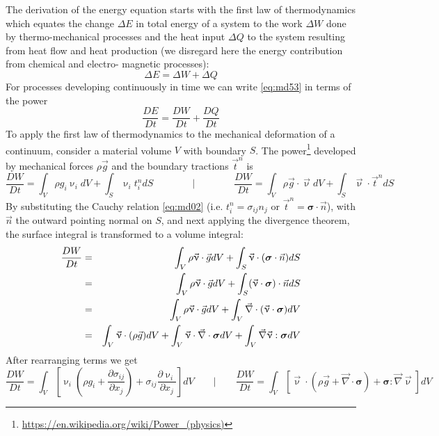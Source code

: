 The derivation of the energy equation starts with the first law of thermodynamics which
equates the change $\Delta E$ in total energy of a system to the work $\Delta W$ done by 
thermo-mechanical processes and the heat input $\Delta Q$ to the system resulting from heat flow and
heat production (we disregard here the energy contribution from chemical and electro-
magnetic processes):
\begin{equation}
\Delta E = \Delta W + \Delta Q
\label{eq:md53}
\end{equation}
For processes developing continuously in time we can write \eqref{eq:md53} in terms of the power
\begin{equation}
\frac{D E}{Dt} = \frac{D W}{Dt} + \frac{D Q}{Dt}
\label{eq:md54}
\end{equation}
To apply the first law of thermodynamics to the mechanical deformation of a continuum,
consider a material volume $V$ with boundary $S$. The power\footnote{
\url{https://en.wikipedia.org/wiki/Power_(physics)}} developed by mechanical
forces $\rho \vec{g}$ and the boundary tractions $\vec{t}^n$ is
\begin{equation}
\frac{DW}{Dt} = \int_V \rho g_i \upnu_i dV + \int_S \upnu_i t_i^n  dS
\qquad
\qquad
\bigg\rvert
\qquad
\qquad
\frac{DW}{Dt} = \int_V \rho \vec{g}\cdot \vec\upnu dV 
+ \int_S \vec\upnu\cdot \vec{t}^n  dS
\label{eq:md55}
\end{equation}
By substituting the Cauchy relation \eqref{eq:md02}
(i.e. $t_i^n = \sigma_{ij}n_j$ or $\vec{t}^n={\bm \sigma}\cdot\vec{n}$), 
with $\vec{n}$ the outward pointing normal
on $S$, and next applying the divergence theorem, 
the surface integral is transformed to a volume integral:
\begin{eqnarray}
\frac{DW}{Dt} 
&=& \int_V \rho \vec{\upnu}\cdot \vec{g} dV + \int_S \vec\upnu\cdot  ({\bm \sigma} \cdot \vec{n}) dS \nonumber\\
&=& \int_V \rho \vec{\upnu}\cdot \vec{g} dV + \int_S (\vec\upnu\cdot  {\bm \sigma}) \cdot \vec{n} dS \nonumber\\
&=& \int_V \rho \vec{\upnu}\cdot \vec{g} dV + \int_V \vec\nabla \cdot ( \vec\upnu \cdot  {\bm \sigma} ) dV \nonumber\\
&=& \int_V \vec{\upnu}\cdot (\rho \vec{g}) dV 
+ \int_V \vec\upnu \cdot \vec\nabla\cdot  {\bm \sigma}  dV 
+ \int_V \vec\nabla \vec\upnu :   {\bm \sigma}  dV \nonumber
\end{eqnarray}
After rearranging terms we get
\begin{equation}
\frac{DW}{Dt} = \int_V 
\left[ \upnu_i \left( \rho g_i + \frac{\partial\sigma_{ij}}{\partial x_j}  \right) 
+ \sigma_{ij} \frac{\partial \upnu_i }{\partial x_j}
\right] dV
\quad
\quad
\bigg\rvert
\quad
\quad
\frac{DW}{Dt} = \int_V 
\left[
\vec\upnu\cdot ( \rho \vec{g} + \vec\nabla\cdot {\bm \sigma})
+{\bm \sigma} : \vec\nabla\vec\upnu
\right]
dV
\label{eq:md56}
\end{equation}
